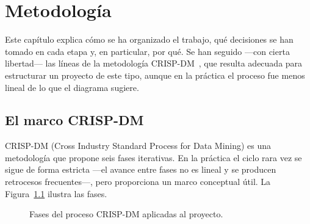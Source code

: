 \chapter{Metodología}	
\label{ch:metodología}

Este capítulo explica cómo se ha organizado el trabajo, qué decisiones se han tomado en cada etapa y, en particular, por qué. Se han seguido ---con cierta libertad--- las líneas de la metodología CRISP-DM~\cite{wirth2000crisp}, que resulta adecuada para estructurar un proyecto de este tipo, aunque en la práctica el proceso fue menos lineal de lo que el diagrama sugiere.

\section{El marco CRISP-DM}

CRISP-DM (Cross Industry Standard Process for Data Mining) es una metodología que propone seis fases iterativas. En la práctica el ciclo rara vez se sigue de forma estricta ---el avance entre fases no es lineal y se producen retrocesos frecuentes---, pero proporciona un marco conceptual útil. La Figura~\ref{fig:crisp_dm} ilustra las fases.

\begin{figure}[H]
\centering
{}
\caption{Fases del proceso CRISP-DM aplicadas al proyecto.}
\label{fig:crisp_dm}
\end{figure}

